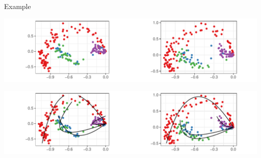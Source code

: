 \documentclass[
  ignorenonframetext,
]{beamer}
\begin{document}
\begin{frame}{Example}
\protect\hypertarget{example}{}
\begin{center}\includegraphics[width=1\linewidth]{slides_files/figure-beamer/mbconnectome-ase-2-1} \end{center}

\begin{center}\includegraphics[width=1\linewidth]{slides_files/figure-beamer/mbconnectome-kcurves-1} \end{center}
\end{frame}
\end{document}
